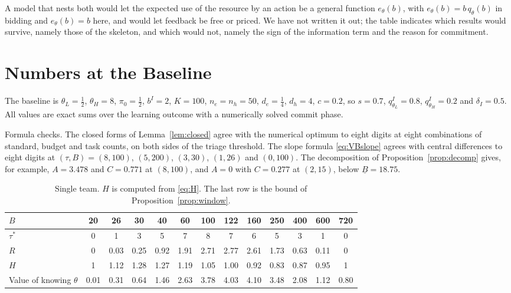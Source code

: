 \documentclass[11pt]{article}
\theoremstyle{definition}
\begin{document}
A model that nests both would let the expected use of the resource by an action be a general function $e_\theta(b)$, with $e_\theta(b)=b\,q_\theta(b)$ in bidding and $e_\theta(b)=b$ here, and would let feedback be free or priced. We have not written it out; the table indicates which results would survive, namely those of the skeleton, and which would not, namely the sign of the information term and the reason for commitment.

\section{Numbers at the Baseline}\label{sec:numbers}

The baseline is $\theta_L=\tfrac12$, $\theta_H=8$, $\pi_0=\tfrac12$, $b^I=2$, $K=100$, $n_e=n_h=50$, $d_e=\tfrac14$, $d_h=4$, $c=0.2$, so $s=0.7$, $q_{\theta_L}^I=0.8$, $q_{\theta_H}^I=0.2$ and $\delta_I=0.5$. All values are exact sums over the learning outcome with a numerically solved commit phase.

Formula checks. The closed forms of Lemma~\ref{lem:closed} agree with the numerical optimum to eight digits at eight combinations of standard, budget and task counts, on both sides of the triage threshold. The slope formula \eqref{eq:VBslope} agrees with central differences to eight digits at $(\tau,B)=(8,100)$, $(5,200)$, $(3,30)$, $(1,26)$ and $(0,100)$. The decomposition of Proposition~\ref{prop:decomp} gives, for example, $A=3.478$ and $C=0.771$ at $(8,100)$, and $A=0$ with $C=0.277$ at $(2,15)$, below $\underline B=18.75$.

\begin{table}[htbp]
\centering
\small
\setlength{\tabcolsep}{4pt}
\begin{tabular}{@{}lcccccccccccc@{}}
\toprule
$B$ & 20 & 26 & 30 & 40 & 60 & 100 & 122 & 160 & 250 & 400 & 600 & 720 \\
\midrule
$\tau^*$ & 0 & 1 & 3 & 5 & 7 & 8 & 7 & 6 & 5 & 3 & 1 & 0 \\
$R$ & 0 & 0.03 & 0.25 & 0.92 & 1.91 & 2.71 & 2.77 & 2.61 & 1.73 & 0.63 & 0.11 & 0 \\
$H$ & 1 & 1.12 & 1.28 & 1.27 & 1.19 & 1.05 & 1.00 & 0.92 & 0.83 & 0.87 & 0.95 & 1 \\
Value of knowing $\theta$ & 0.01 & 0.31 & 0.64 & 1.46 & 2.63 & 3.78 & 4.03 & 4.10 & 3.48 & 2.08 & 1.12 & 0.80 \\
\bottomrule
\end{tabular}
\caption{Single team. $H$ is computed from \eqref{eq:H}. The last row is the bound of Proposition~\ref{prop:window}.}
\label{tab:single}
\end{table}
\end{document}
